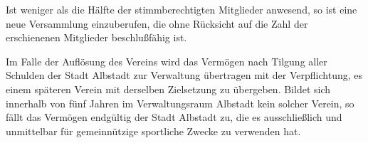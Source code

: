 \documentclass[10pt,a4paper,parskip=half]{scrartcl}
\begin{document}
\begin{contract}
\begin{multicols}{2}
    Ist weniger als die Hälfte der stimmberechtigten Mitglieder anwesend,
    so ist eine neue Versammlung einzuberufen,
    die ohne Rücksicht auf die Zahl der erschienenen Mitglieder beschlußfähig ist.
    
    Im Falle der Auflösung des Vereins wird das Vermögen nach Tilgung aller Schulden der Stadt Albstadt zur Verwaltung übertragen mit der Verpflichtung,
    es einem späteren Verein mit derselben Zielsetzung zu übergeben.
    Bildet sich innerhalb von fünf Jahren im Verwaltungsraum Albstadt kein solcher Verein,
    so fällt das Vermögen endgültig der Stadt Albstadt zu,
    die es ausschließlich und unmittelbar für gemeinnützige sportliche Zwecke zu verwenden hat.
  \end{multicols}
\end{contract}
\end{document}
